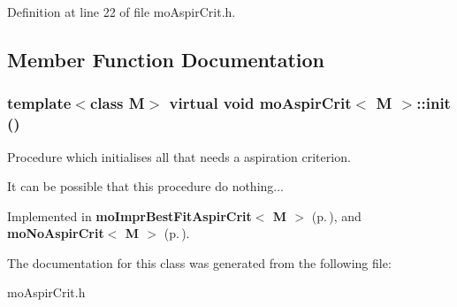 Definition at line 22 of file mo\-Aspir\-Crit.h.

\subsection{Member Function Documentation}
\subsubsection{\setlength{\rightskip}{0pt plus 5cm}template$<$class M$>$ virtual void {\bf mo\-Aspir\-Crit}$<$ M $>$::init ()\hspace{0.3cm}{\tt  [pure virtual]}}\label{classmo_aspir_crit_a8ce84510a5ec7c9078381e542c6d140}


Procedure which initialises all that needs a aspiration criterion. 

It can be possible that this procedure do nothing... 

Implemented in {\bf mo\-Impr\-Best\-Fit\-Aspir\-Crit$<$ M $>$} {\rm (p.\,\pageref{classmo_impr_best_fit_aspir_crit_ffa451a14ff4ea86fb8bd9fdbc348630})}, and {\bf mo\-No\-Aspir\-Crit$<$ M $>$} {\rm (p.\,\pageref{classmo_no_aspir_crit_f3a286fc4c2d36bd390ba9a3074f3037})}.

The documentation for this class was generated from the following file:\begin{CompactItemize}
\item 
mo\-Aspir\-Crit.h\end{CompactItemize}

